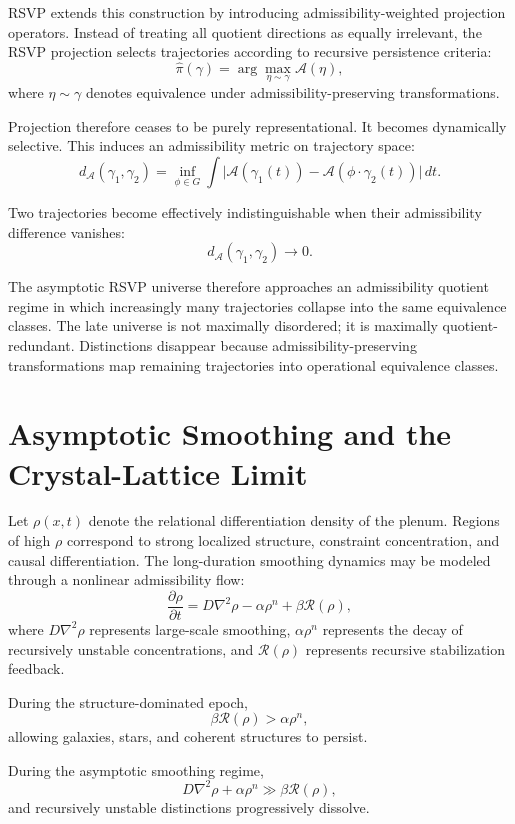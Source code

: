 \documentclass[12pt, a4paper]{article}
\newcommand{\Afield}{\mathcal{A}}
\newcommand{\proj}{\hat{\pi}}
\begin{document}
RSVP extends this construction by introducing admissibility-weighted
projection operators. Instead of treating all quotient directions as equally
irrelevant, the RSVP projection selects trajectories according to recursive
persistence criteria:
\[
\proj(\gamma)
=
\arg\max_{\eta \sim \gamma}
\Afield(\eta),
\]
where \(\eta \sim \gamma\) denotes equivalence under
admissibility-preserving transformations.

Projection therefore ceases to be purely representational. It becomes
dynamically selective. This induces an admissibility metric on trajectory
space:
\[
d_{\Afield}(\gamma_1,\gamma_2)
=
\inf_{\phi \in G}
\int
\bigl|
\Afield(\gamma_1(t))
-
\Afield(\phi \cdot \gamma_2(t))
\bigr|
\, dt.
\]

Two trajectories become effectively indistinguishable when their
admissibility difference vanishes:
\[
d_{\Afield}(\gamma_1,\gamma_2) \to 0.
\]

The asymptotic RSVP universe therefore approaches an admissibility quotient
regime in which increasingly many trajectories collapse into the same
equivalence classes. The late universe is not maximally disordered; it is
maximally quotient-redundant. Distinctions disappear because
admissibility-preserving transformations map remaining trajectories into
operational equivalence classes.

\section{Asymptotic Smoothing and the Crystal-Lattice Limit}

Let \(\rho(x,t)\) denote the relational differentiation density of the
plenum. Regions of high \(\rho\) correspond to strong localized structure,
constraint concentration, and causal differentiation. The long-duration
smoothing dynamics may be modeled through a nonlinear admissibility flow:
\[
\frac{\partial \rho}{\partial t}
=
D \nabla^2 \rho
-
\alpha \rho^n
+
\beta \mathcal{R}(\rho),
\]
where \(D \nabla^2 \rho\) represents large-scale smoothing,
\(\alpha \rho^n\) represents the decay of recursively unstable
concentrations, and \(\mathcal{R}(\rho)\) represents recursive
stabilization feedback.

During the structure-dominated epoch,
\[
\beta \mathcal{R}(\rho) > \alpha \rho^n,
\]
allowing galaxies, stars, and coherent structures to persist.

During the asymptotic smoothing regime,
\[
D \nabla^2 \rho + \alpha \rho^n \gg \beta \mathcal{R}(\rho),
\]
and recursively unstable distinctions progressively dissolve.
\end{document}
